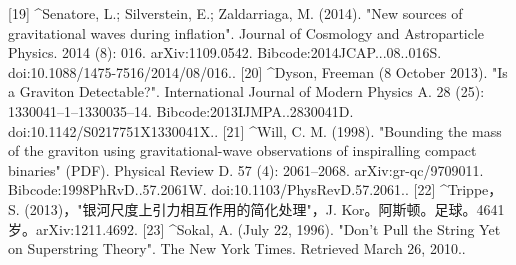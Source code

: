 [19]
^Senatore, L.; Silverstein, E.; Zaldarriaga, M. (2014). "New sources of gravitational waves during inflation". Journal of Cosmology and Astroparticle Physics. 2014 (8): 016. arXiv:1109.0542. Bibcode:2014JCAP...08..016S. doi:10.1088/1475-7516/2014/08/016..
[20]
^Dyson, Freeman (8 October 2013). "Is a Graviton Detectable?". International Journal of Modern Physics A. 28 (25): 1330041–1–1330035–14. Bibcode:2013IJMPA..2830041D. doi:10.1142/S0217751X1330041X..
[21]
^Will, C. M. (1998). "Bounding the mass of the graviton using gravitational-wave observations of inspiralling compact binaries" (PDF). Physical Review D. 57 (4): 2061–2068. arXiv:gr-qc/9709011. Bibcode:1998PhRvD..57.2061W. doi:10.1103/PhysRevD.57.2061..
[22]
^Trippe，S. (2013)，"银河尺度上引力相互作用的简化处理"，J. Kor。阿斯顿。足球。4641岁。arXiv:1211.4692.
[23]
^Sokal, A. (July 22, 1996). "Don't Pull the String Yet on Superstring Theory". The New York Times. Retrieved March 26, 2010..
